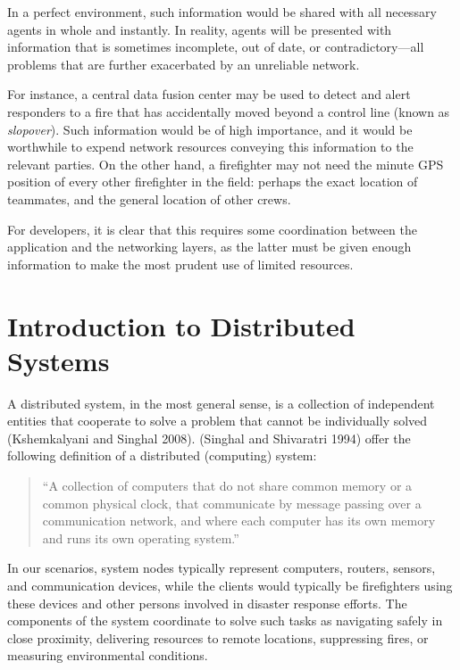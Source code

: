 \documentclass[]             %
{NASA}                       %
\theoremstyle{definition}
\begin{document}
In a perfect environment, such information would be shared with all
necessary agents in whole and instantly. In reality, agents will be
presented with information that is sometimes incomplete, out of date, or
contradictory---all problems that are further exacerbated by an
unreliable network.

For instance, a central data fusion center may be used to detect and
alert responders to a fire that has accidentally moved beyond a control
line (known as \emph{slopover}). Such information would be of high
importance, and it would be worthwhile to expend network resources
conveying this information to the relevant parties. On the other hand, a
firefighter may not need the minute GPS position of every other
firefighter in the field: perhaps the exact location of teammates, and
the general location of other crews.

For developers, it is clear that this requires some coordination between
the application and the networking layers, as the latter must be given
enough information to make the most prudent use of limited resources.

\newpage

\hypertarget{introduction-to-distributed-systems}{%
\section{Introduction to Distributed
Systems}\label{introduction-to-distributed-systems}}

\label{sec:background}

A distributed system, in the most general sense, is a collection of
independent entities that cooperate to solve a problem that cannot be
individually solved (Kshemkalyani and Singhal 2008). (Singhal and
Shivaratri 1994) offer the following definition of a distributed
(computing) system:

\begin{quote}
``A collection of computers that do not share common memory or a common
physical clock, that communicate by message passing over a communication
network, and where each computer has its own memory and runs its own
operating system.''
\end{quote}

In our scenarios, system nodes typically represent computers, routers,
sensors, and communication devices, while the clients would typically be
firefighters using these devices and other persons involved in disaster
response efforts. The components of the system coordinate to solve such
tasks as navigating safely in close proximity, delivering resources to
remote locations, suppressing fires, or measuring environmental
conditions.
\end{document}
